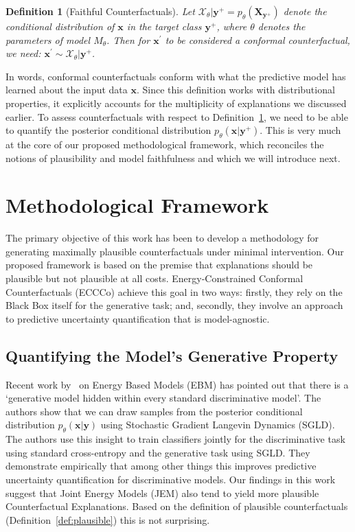 \documentclass{article}
\newtheorem{definition}{Definition}[section]
\begin{document}
\begin{definition}[Faithful Counterfactuals]
  \label{def:faithful}
  Let $\mathcal{X}_{\theta}|\mathbf{y}^+ = p_{\theta}(\mathbf{X}_{\mathbf{y}^+})$ denote the conditional distribution of $\mathbf{x}$ in the target class $\mathbf{y}^+$, where $\theta$ denotes the parameters of model $M_{\theta}$. Then for $\mathbf{x}^{\prime}$ to be considered a conformal counterfactual, we need: $\mathbf{x}^{\prime} \sim \mathcal{X}_{\theta}|\mathbf{y}^+$.
\end{definition}

In words, conformal counterfactuals conform with what the predictive model has learned about the input data $\mathbf{x}$. Since this definition works with distributional properties, it explicitly accounts for the multiplicity of explanations we discussed earlier. To assess counterfactuals with respect to Definition~\ref{def:faithful}, we need to be able to quantify the posterior conditional distribution $p_{\theta}(\mathbf{x}|\mathbf{y}^+)$. This is very much at the core of our proposed methodological framework, which reconciles the notions of plausibility and model faithfulness and which we will introduce next.

\section{Methodological Framework}\label{meth}

The primary objective of this work has been to develop a methodology for generating maximally plausible counterfactuals under minimal intervention. Our proposed framework is based on the premise that explanations should be plausible but not plausible at all costs. Energy-Constrained Conformal Counterfactuals (ECCCo) achieve this goal in two ways: firstly, they rely on the Black Box itself for the generative task; and, secondly, they involve an approach to predictive uncertainty quantification that is model-agnostic.

\subsection{Quantifying the Model's Generative Property}

Recent work by~\citet{grathwohl2020your} on Energy Based Models (EBM) has pointed out that there is a `generative model hidden within every standard discriminative model'. The authors show that we can draw samples from the posterior conditional distribution $p_{\theta}(\mathbf{x}|\mathbf{y})$ using Stochastic Gradient Langevin Dynamics (SGLD). The authors use this insight to train classifiers jointly for the discriminative task using standard cross-entropy and the generative task using SGLD. They demonstrate empirically that among other things this improves predictive uncertainty quantification for discriminative models. Our findings in this work suggest that Joint Energy Models (JEM) also tend to yield more plausible Counterfactual Explanations. Based on the definition of plausible counterfactuals (Definition~\ref{def:plausible}) this is not surprising. 
\end{document}
